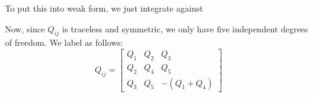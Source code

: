 \documentclass[reqno]{article}
\begin{document}
	To put this into weak form, we just integrate against 
	
	Now, since $Q_{ij}$ is traceless and symmetric, we only have five independent degrees of freedom.
	We label as follows:
	\begin{equation}
	Q_{ij}
	= \begin{bmatrix}
	Q_1 & Q_2 & Q_3 \\
	Q_2 & Q_4 & Q_5 \\
	Q_3 & Q_5 & -(Q_1 + Q_4)
	\end{bmatrix}
	\end{equation}
	
\end{document}
